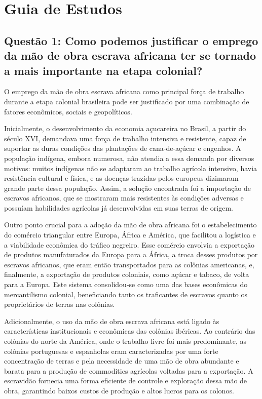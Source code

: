 \documentclass[a4paper,12pt]{article}[abntex2]
\begin{document}
\newpage
\section{\textbf{Guia de Estudos}}

\subsection{\textbf{Questão 1: Como podemos justificar o emprego da mão de obra escrava africana ter se tornado a mais importante na etapa colonial?}}

O emprego da mão de obra escrava africana como principal força de trabalho durante a etapa colonial brasileira pode ser justificado por uma combinação de fatores econômicos, sociais e geopolíticos.

Inicialmente, o desenvolvimento da economia açucareira no Brasil, a partir do século XVI, demandava uma força de trabalho intensiva e resistente, capaz de suportar as duras condições das plantações de cana-de-açúcar e engenhos. A população indígena, embora numerosa, não atendia a essa demanda por diversos motivos: muitos indígenas não se adaptaram ao trabalho agrícola intensivo, havia resistência cultural e física, e as doenças trazidas pelos europeus dizimaram grande parte dessa população. Assim, a solução encontrada foi a importação de escravos africanos, que se mostraram mais resistentes às condições adversas e possuíam habilidades agrícolas já desenvolvidas em suas terras de origem.

Outro ponto crucial para a adoção da mão de obra africana foi o estabelecimento do comércio triangular entre Europa, África e América, que facilitou a logística e a viabilidade econômica do tráfico negreiro. Esse comércio envolvia a exportação de produtos manufaturados da Europa para a África, a troca desses produtos por escravos africanos, que eram então transportados para as colônias americanas, e, finalmente, a exportação de produtos coloniais, como açúcar e tabaco, de volta para a Europa. Este sistema consolidou-se como uma das bases econômicas do mercantilismo colonial, beneficiando tanto os traficantes de escravos quanto os proprietários de terras nas colônias.

Adicionalmente, o uso da mão de obra escrava africana está ligado às características institucionais e econômicas das colônias ibéricas. Ao contrário das colônias do norte da América, onde o trabalho livre foi mais predominante, as colônias portuguesas e espanholas eram caracterizadas por uma forte concentração de terras e pela necessidade de uma mão de obra abundante e barata para a produção de commodities agrícolas voltadas para a exportação. A escravidão fornecia uma forma eficiente de controle e exploração dessa mão de obra, garantindo baixos custos de produção e altos lucros para os colonos.
\end{document}
